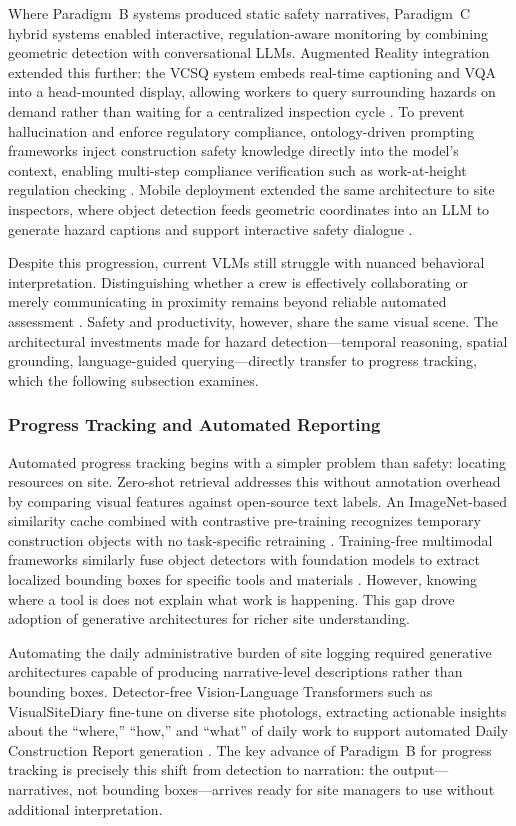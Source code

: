 \documentclass[10pt,letterpaper]{article}
\begin{document}
Where Paradigm~B systems produced static safety narratives, Paradigm~C hybrid systems enabled interactive, regulation-aware monitoring by combining geometric detection with conversational LLMs. Augmented Reality integration extended this further: the VCSQ system embeds real-time captioning and VQA into a head-mounted display, allowing workers to query surrounding hazards on demand rather than waiting for a centralized inspection cycle \cite{chen2024}. To prevent hallucination and enforce regulatory compliance, ontology-driven prompting frameworks inject construction safety knowledge directly into the model's context, enabling multi-step compliance verification such as work-at-height regulation checking \cite{chan2025}. Mobile deployment extended the same architecture to site inspectors, where object detection feeds geometric coordinates into an LLM to generate hazard captions and support interactive safety dialogue \cite{hussain2026}.

Despite this progression, current VLMs still struggle with nuanced behavioral interpretation. Distinguishing whether a crew is effectively collaborating or merely communicating in proximity remains beyond reliable automated assessment \cite{bui2026}. Safety and productivity, however, share the same visual scene. The architectural investments made for hazard detection---temporal reasoning, spatial grounding, language-guided querying---directly transfer to progress tracking, which the following subsection examines.

\subsubsection{Progress Tracking and Automated Reporting}

Automated progress tracking begins with a simpler problem than safety: locating resources on site. Zero-shot retrieval addresses this without annotation overhead by comparing visual features against open-source text labels. An ImageNet-based similarity cache combined with contrastive pre-training recognizes temporary construction objects with no task-specific retraining \cite{liang2024}. Training-free multimodal frameworks similarly fuse object detectors with foundation models to extract localized bounding boxes for specific tools and materials \cite{zhang2025}. However, knowing where a tool is does not explain what work is happening. This gap drove adoption of generative architectures for richer site understanding.

Automating the daily administrative burden of site logging required generative architectures capable of producing narrative-level descriptions rather than bounding boxes. Detector-free Vision-Language Transformers such as VisualSiteDiary fine-tune on diverse site photologs, extracting actionable insights about the ``where,'' ``how,'' and ``what'' of daily work to support automated Daily Construction Report generation \cite{jung2024}. The key advance of Paradigm~B for progress tracking is precisely this shift from detection to narration: the output---narratives, not bounding boxes---arrives ready for site managers to use without additional interpretation.
\end{document}
